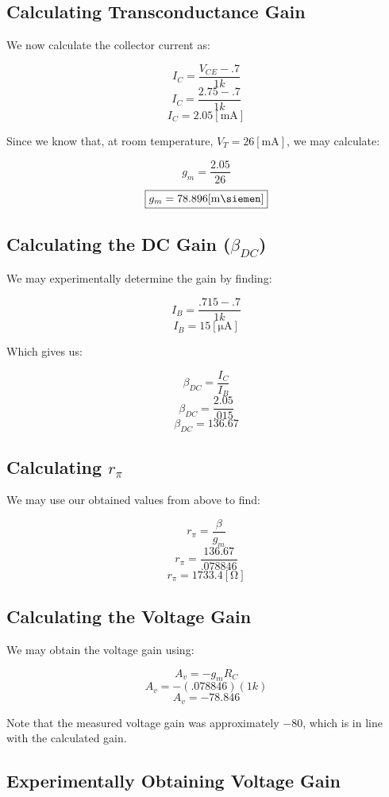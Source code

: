 \documentclass[
	letterpaper, %
	10pt, %
]{CSUniSchoolLabReport}
\begin{document}
\subsection{Calculating Transconductance Gain}

We now calculate the collector current as:

$$I_C=\frac{V_{CE}-.7}{1k}$$
$$I_C=\frac{2.75-.7}{1k}$$
$$\boxed{I_C=2.05[\si{\milli\ampere}]}$$

Since we know that, at room temperature, $V_T=26[\si{\milli\ampere}]$, we may calculate:

$$g_m=\frac{2.05}{26}$$
$$\boxed{g_m=78.896[\si{\milli\siemen}]}$$

\subsection{Calculating the DC Gain ($\beta_{DC}$)}

We may experimentally determine the gain by finding:

$$I_B=\frac{.715-.7}{1k}$$
$$\boxed{I_B=15[\si{\micro\ampere}]}$$

Which gives us:

$$\beta_{DC}=\frac{I_C}{I_B}$$
$$\beta_{DC}=\frac{2.05}{.015}$$
$$\boxed{\beta_{DC}=136.67}$$

\subsection{Calculating $r_{\pi}$}

We may use our obtained values from above to find:

$$r_{\pi}=\frac{\beta}{g_m}$$
$$r_{\pi}=\frac{136.67}{.078846}$$
$$\boxed{r_{\pi}=1733.4[\si{\ohm}]}$$

\subsection{Calculating the Voltage Gain}

We may obtain the voltage gain using:

$$A_v=-g_mR_C$$
$$A_v=-(.078846)(1k)$$
$$\boxed{A_v=-78.846}$$

Note that the measured voltage gain was approximately $-80$, which is in line with the calculated gain.

\subsection{Experimentally Obtaining Voltage Gain}
\end{document}
